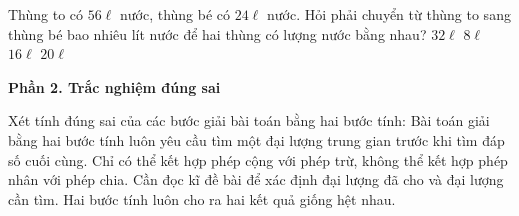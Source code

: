\begin{ex} %
Thùng to có $56\ell$ nước, thùng bé có $24\ell$ nước. Hỏi phải chuyển từ thùng to sang thùng bé bao nhiêu lít nước để hai thùng có lượng nước bằng nhau?
\choice
{$32\ell$}
{$8\ell$}
{\True $16\ell$}
{$20\ell$}
\end{ex}

\textbf{Phần 2. Trắc nghiệm đúng sai}

\begin{ex} %
Xét tính đúng sai của các bước giải bài toán bằng hai bước tính:
\choiceTF
{\True Bài toán giải bằng hai bước tính luôn yêu cầu tìm một đại lượng trung gian trước khi tìm đáp số cuối cùng.}
{Chỉ có thể kết hợp phép cộng với phép trừ, không thể kết hợp phép nhân với phép chia.}
{\True Cần đọc kĩ đề bài để xác định đại lượng đã cho và đại lượng cần tìm.}
{Hai bước tính luôn cho ra hai kết quả giống hệt nhau.}
\end{ex}

